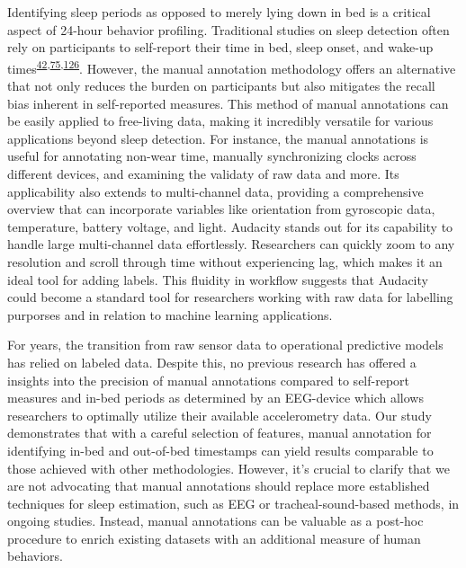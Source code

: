 \documentclass[
  10pt,
]{scrbook}
\begin{document}
Identifying sleep periods as opposed to merely lying down in bed is a
critical aspect of 24-hour behavior profiling. Traditional studies on
sleep detection often rely on participants to self-report their time in
bed, sleep onset, and wake-up
times\textsuperscript{\protect\hyperlink{ref-girschik_validation_2012}{42},\protect\hyperlink{ref-littner_2003}{75},\protect\hyperlink{ref-lockley_1999}{126}}.
However, the manual annotation methodology offers an alternative that
not only reduces the burden on participants but also mitigates the
recall bias inherent in self-reported measures. This method of manual
annotations can be easily applied to free-living data, making it
incredibly versatile for various applications beyond sleep detection.
For instance, the manual annotations is useful for annotating non-wear
time, manually synchronizing clocks across different devices, and
examining the validaty of raw data and more. Its applicability also
extends to multi-channel data, providing a comprehensive overview that
can incorporate variables like orientation from gyroscopic data,
temperature, battery voltage, and light. Audacity stands out for its
capability to handle large multi-channel data effortlessly. Researchers
can quickly zoom to any resolution and scroll through time without
experiencing lag, which makes it an ideal tool for adding labels. This
fluidity in workflow suggests that Audacity could become a standard tool
for researchers working with raw data for labelling purporses and in
relation to machine learning applications.

For years, the transition from raw sensor data to operational predictive
models has relied on labeled data. Despite this, no previous research
has offered a insights into the precision of manual annotations compared
to self-report measures and in-bed periods as determined by an
EEG-device which allows researchers to optimally utilize their available
accelerometry data. Our study demonstrates that with a careful selection
of features, manual annotation for identifying in-bed and out-of-bed
timestamps can yield results comparable to those achieved with other
methodologies. However, it's crucial to clarify that we are not
advocating that manual annotations should replace more established
techniques for sleep estimation, such as EEG or tracheal-sound-based
methods, in ongoing studies. Instead, manual annotations can be valuable
as a post-hoc procedure to enrich existing datasets with an additional
measure of human behaviors.
\end{document}
